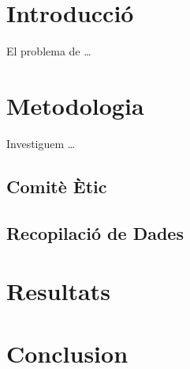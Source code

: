 \documentclass{article}
\begin{document}
\section{Introducció}

El problema de \ldots

\section{Metodologia}

Investiguem \ldots

\subsection{Comitè Ètic}

\subsection{Recopilació de Dades}

\section{Resultats}

\section{Conclusion}
\end{document}
